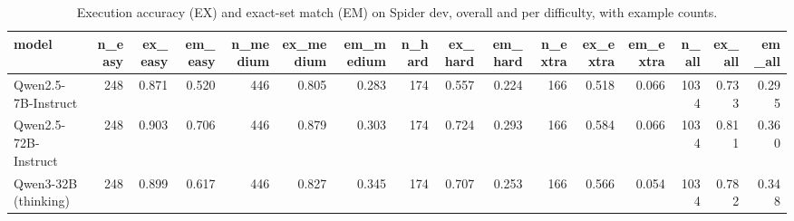 \begin{table}[htbp]
\caption{Execution accuracy (EX) and exact-set match (EM) on Spider dev, overall and per difficulty, with example counts.}
\label{tab:task1_accuracy}
\begin{tabular}{lrrrrrrrrrrrrrrr}
\toprule
model & n\_easy & ex\_easy & em\_easy & n\_medium & ex\_medium & em\_medium & n\_hard & ex\_hard & em\_hard & n\_extra & ex\_extra & em\_extra & n\_all & ex\_all & em\_all \\
\midrule
Qwen2.5-7B-Instruct & 248 & 0.871 & 0.520 & 446 & 0.805 & 0.283 & 174 & 0.557 & 0.224 & 166 & 0.518 & 0.066 & 1034 & 0.733 & 0.295 \\
Qwen2.5-72B-Instruct & 248 & 0.903 & 0.706 & 446 & 0.879 & 0.303 & 174 & 0.724 & 0.293 & 166 & 0.584 & 0.066 & 1034 & 0.811 & 0.360 \\
Qwen3-32B (thinking) & 248 & 0.899 & 0.617 & 446 & 0.827 & 0.345 & 174 & 0.707 & 0.253 & 166 & 0.566 & 0.054 & 1034 & 0.782 & 0.348 \\
\bottomrule
\end{tabular}
\end{table}
